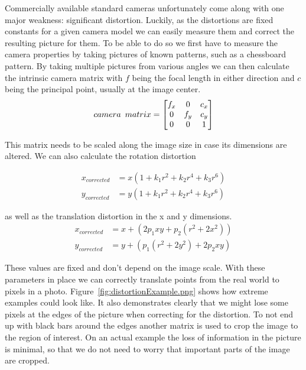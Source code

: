 Commercially available standard cameras unfortunately come along with one major weakness: significant distortion.
Luckily, as the distortions are fixed constants for a given camera model we can easily measure them and correct the resulting picture for them.
To be able to do so we first have to measure the camera properties by taking pictures of known patterns, such as a chessboard pattern.
By taking multiple pictures from various angles we can then calculate the intrinsic camera matrix with $f$ being the focal length in either direction and $c$ being the principal point, usually at the image center.
\[
    camera \hspace{5px}matrix =
    \begin{bmatrix}
        f_{x} & 0 & c_{x} \\
        0 & f_{y} & c_{y} \\
        0 & 0 & 1
    \end{bmatrix}
\]

This matrix needs to be scaled along the image size in case its dimensions are altered.
We can also calculate the rotation distortion

\begin{align*}
    x_{corrected} &= x(1 + k_{1}r^{2} + k_{2}r^{4} + k_{3}r^{6}) \\
    y_{corrected} &= y(1 + k_{1}r^{2} + k_{2}r^{4} + k_{3}r^{6})
\end{align*}

as well as the translation distortion in the x and y dimensions.
\begin{align*}
    x_{corrected} &= x + (2p_{1}xy + p_{2}(r^{2} + 2x^{2})) \\
    y_{corrected} &= y + (p_{1} (r^{2} + 2y^{2}) + 2p_{2}xy)
\end{align*}

These values are fixed and don't depend on the image scale.
With these parameters in place we can correctly translate points from the real world to pixels in a photo.
Figure~\ref{fig:distortionExample.png} shows how extreme examples could look like.
It also demonstrates clearly that we might lose some pixels at the edges of the picture when correcting for the distortion.
To not end up with black bars around the edges another matrix is used to crop the image to the region of interest.
On an actual example the loss of information in the picture is minimal, so that we do not need to worry that important parts of the image are cropped.

